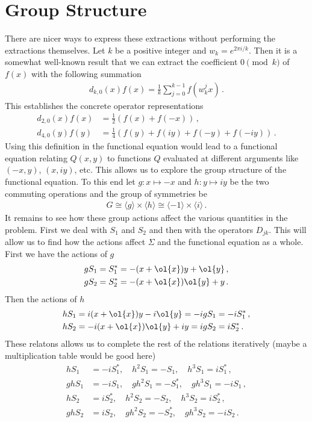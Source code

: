 \section{Group Structure}

There are nicer ways to express these extractions without performing the extractions themselves. Let $k$ be a positive integer and $w_k = e^{2\pi i/k}$. Then it is a somewhat well-known result that we can extract the coefficient $0 \pmod k$ of $f(x)$ with the following summation
\begin{align}
	d_{k,0}(x)f(x) = \frac{1}{k}\sum_{j=0}^{k-1} f(w_k^j x)\,.
\end{align}
This establishes the concrete operator representations
\begin{align}
	d_{2,0}(x)f(x) &= \frac{1}{2}(f(x) + f(-x))\,,\\
	d_{4,0}(y)f(y) &= \frac{1}{4}(f(y)+f(iy)+f(-y)+f(-iy))\,.
\end{align}
Using this definition in the functional equation would lead to a functional equation relating $Q(x,y)$ to functions $Q$ evaluated at different arguments like $(-x,y)$, $(x,iy)$, etc. This allows us to explore the group structure of the functional equation. To this end let $g: x \mapsto -x$ and $h: y \mapsto i y$ be the two commuting operations and the group of symmetries be
\begin{align}
	G \cong \langle g\rangle \times \langle h\rangle \cong \langle-1\rangle\times\langle i\rangle\,.
\end{align}
It remains to see how these group actions affect the various quantities in the problem. First we deal with $S_1$ and $S_2$ and then with the operators $D_{jk}$. This will allow us to find how the actions affect $\Sigma$ and the functional equation as a whole. First we have the actions of $g$
\begin{align}
	gS_1 &= S_1^\ast = -(x+\ol{x})y+\ol{y}\,,\\
	gS_2 &= S_2^\ast = -(x+\ol{x})\ol{y} + y\,.
\end{align}
Then the actions of $h$
\begin{align}
	hS_1 &= i(x+\ol{x})y-i\ol{y} = -igS_1 = -iS_1^\ast\,,\\
	hS_2 &= -i(x+\ol{x})\ol{y}+iy = igS_2 = iS_2^\ast\,.
\end{align}
These relatons allows us to complete the rest of the relations iteratively (maybe a multiplication table would be good here)
\begin{align}
	hS_1 &=-iS_1^\ast,\quad h^2 S_1 = -S_1,\quad h^3 S_1 = i S_1^\ast\,,\\
	ghS_1 &=-iS_1, \quad gh^2 S_1 = -S_1^\ast,\quad gh^3 S_1 =- i S_1\,,\\
	hS_2&= iS_2^\ast,\quad h^2 S_2 = -S_2,\quad h^3 S_2 = i S_2^\ast\,,\\
	ghS_2 &= iS_2,\quad gh^2 S_2 = -S_2^\ast,\quad gh^3 S_2 = -i S_2\,.\\
\end{align}
